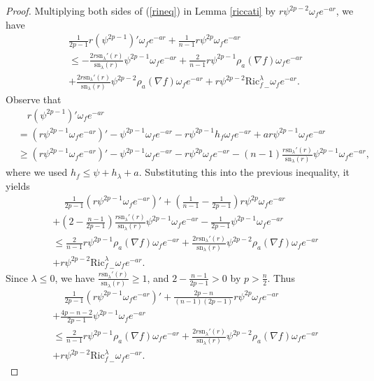 \documentclass[11pt]{amsart}
\numberwithin{equation}{section}
\newcommand{\sn}{\mathrm{sn}}
\begin{document}
\begin{proof}
	Multiplying both sides of  (\ref{rineq}) in Lemma \ref{riccati} by $r\psi^{2p-2}\omega_fe^{-ar}$, we have
	\begin{align*}
		&\frac{1}{2p-1}r(\psi^{2p-1})'\omega_fe^{-ar}+\frac{1}{n-1}r\psi^{2p}\omega_fe^{-ar}\\&\leq -\frac{2r\sn_\lambda'(r)}{\sn_\lambda(r)}\psi^{2p-1}\omega_fe^{-ar}+\frac{2}{n-1}r\psi^{2p-1}\rho_a(\nabla f)\omega_fe^{-ar}\\&+\frac{2r\sn_\lambda'(r)}{\sn_\lambda(r)}\psi^{2p-2}\rho_a(\nabla f)\omega_fe^{-ar}+r\psi^{2p-2}{\mathrm{Ric}^\lambda_f}_-\omega_fe^{-ar}.
	\end{align*}
	Observe that
	\begin{align*}
		&\quad r(\psi^{2p-1})'\omega_fe^{-ar}\\&=(r\psi^{2p-1}\omega_fe^{-ar})'-\psi^{2p-1}\omega_fe^{-ar}-r\psi^{2p-1}h_f\omega_fe^{-ar}+ar\psi^{2p-1}\omega_fe^{-ar}\\
		&\geq (r\psi^{2p-1}\omega_fe^{-ar})'-\psi^{2p-1}\omega_fe^{-ar}-r\psi^{2p}\omega_fe^{-ar}-(n-1)\frac{r\sn_\lambda'(r)}{\sn_\lambda(r)}\psi^{2p-1}\omega_fe^{-ar},
	\end{align*}
	where we used $h_f\leq \psi+h_\lambda+a$. Substituting this into the previous inequality, it yields
	\begin{equation*}
		\begin{aligned}
			&\quad\,\frac{1}{2p-1}(r\psi^{2p-1}\omega_fe^{-ar})'+\left(\frac{1}{n-1}-\frac{1}{2p-1}\right)r\psi^{2p}\omega_fe^{-ar}\\
			&+\left(2-\frac{n-1}{2p-1}\right)\frac{r\sn_\lambda'(r)}{\sn_\lambda(r)}\psi^{2p-1}\omega_fe^{-ar}-\frac{1}{2p-1}\psi^{2p-1}\omega_fe^{-ar}\\
			&\leq \frac{2}{n-1}r\psi^{2p-1}\rho_a(\nabla f)\omega_fe^{-ar}+\frac{2r\sn_\lambda'(r)}{\sn_\lambda(r)}\psi^{2p-2}\rho_a(\nabla f)\omega_fe^{-ar}\\
			&+r\psi^{2p-2}{\mathrm{Ric}^\lambda_f}_-\omega_fe^{-ar}.
		\end{aligned}
	\end{equation*}
	Since $\lambda\leq 0$, we have $\frac{r\sn_\lambda'(r)}{\sn_\lambda(r)}\geq 1$, and $2-\frac{n-1}{2p-1}>0$ by $p>\frac{n}{2}$. Thus
	\begin{equation}
		\begin{aligned}
			&\quad\,\frac{1}{2p-1}(r\psi^{2p-1}\omega_fe^{-ar})'+\frac{2p-n}{(n-1)(2p-1)}r\psi^{2p}\omega_fe^{-ar}\\
			&+\frac{4p-n-2}{2p-1}\psi^{2p-1}\omega_fe^{-ar}\\
			&\leq \frac{2}{n-1}r\psi^{2p-1}\rho_a(\nabla f)\omega_fe^{-ar}+\frac{2r\sn_\lambda'(r)}{\sn_\lambda(r)}\psi^{2p-2}\rho_a(\nabla f)\omega_fe^{-ar}\\
			&+r\psi^{2p-2}{\mathrm{Ric}^\lambda_f}_-\omega_fe^{-ar}.\label{rineq-deal}
		\end{aligned}
	\end{equation}
	

\end{proof}
\end{document}
